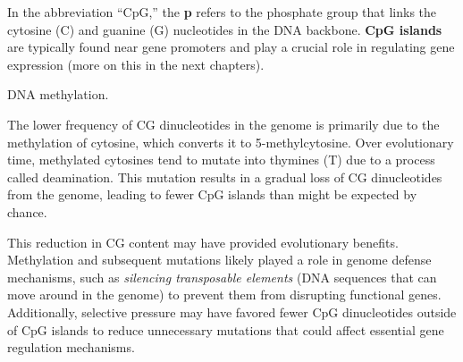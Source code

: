 In the abbreviation ``CpG,'' the \textbf{p} refers to the phosphate group that links the cytosine (C) and guanine (G) nucleotides in the DNA backbone. \textbf{CpG islands} are typically found near gene promoters and play a crucial role in regulating gene expression (more on this in the next chapters).

\begin{marginfigure}
  \caption[6pt]{DNA methylation.}
  \label{fig:g-dna-methylation}
\end{marginfigure}

The lower frequency of CG dinucleotides in the genome is primarily due to the methylation of cytosine, which converts it to 5-methylcytosine. Over evolutionary time, methylated cytosines tend to mutate into thymines (T) due to a process called deamination. This mutation results in a gradual loss of CG dinucleotides from the genome, leading to fewer CpG islands than might be expected by chance.

This reduction in CG content may have provided evolutionary benefits. Methylation and subsequent mutations likely played a role in genome defense mechanisms, such as \textit{silencing transposable elements} (DNA sequences that can move around in the genome) to prevent them from disrupting functional genes. Additionally, selective pressure may have favored fewer CpG dinucleotides outside of CpG islands to reduce unnecessary mutations that could affect essential gene regulation mechanisms.

